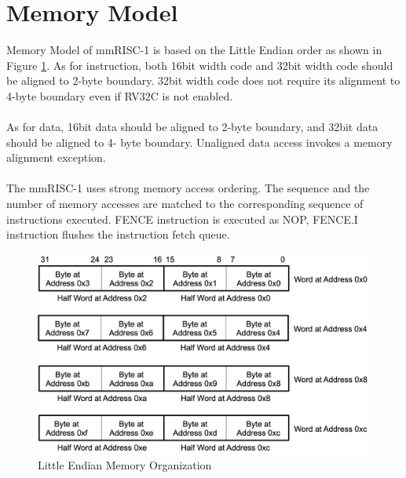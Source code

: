 \section{Memory Model}

Memory Model of mmRISC-1 is based on the Little Endian order as shown in Figure \ref{fig:MEMORYMODEL}. As for instruction, both 16bit width code and 32bit width code should be aligned to 2-byte boundary. 32bit width code does not require its alignment to 4-byte boundary even if RV32C is not enabled.\\\\
As for data, 16bit data should be aligned to 2-byte boundary, and 32bit data should be aligned to 4- byte boundary. Unaligned data access invokes a memory alignment exception.\\\\
The mmRISC-1 uses strong memory access ordering. The sequence and the number of memory accesses are matched to the corresponding sequence of instructions executed. FENCE instruction is executed as NOP, FENCE.I instruction flushes the instruction fetch queue.

\begin{figure}[H]
    \includegraphics[width=1.00\columnwidth]{./Figure/MemoryModel.png}
    \caption{Little Endian Memory Organization}
    \label{fig:MEMORYMODEL}
\end{figure}



